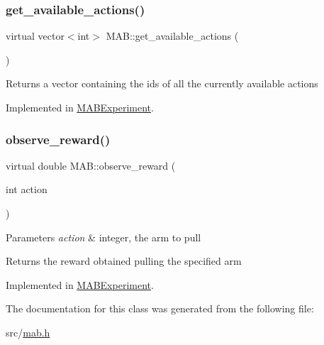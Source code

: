 \subsubsection{\texorpdfstring{get\+\_\+available\+\_\+actions()}{get\_available\_actions()}}
{\footnotesize\ttfamily virtual vector$<$int$>$ M\+A\+B\+::get\+\_\+available\+\_\+actions (\begin{DoxyParamCaption}{ }\end{DoxyParamCaption})\hspace{0.3cm}{\ttfamily [pure virtual]}}

\begin{DoxyReturn}{Returns}
a vector containing the ids of all the currently available actions 
\end{DoxyReturn}


Implemented in \mbox{\hyperlink{class_m_a_b_experiment_af64386f9138dcd31873d9218b7adf6fb}{M\+A\+B\+Experiment}}.

\mbox{\label{class_m_a_b_a83c6ba499e761ea4a246aa7bb790eb46}} 
\subsubsection{\texorpdfstring{observe\+\_\+reward()}{observe\_reward()}}
{\footnotesize\ttfamily virtual double M\+A\+B\+::observe\+\_\+reward (\begin{DoxyParamCaption}\item[{int}]{action }\end{DoxyParamCaption})\hspace{0.3cm}{\ttfamily [pure virtual]}}


\begin{DoxyParams}{Parameters}
{\em action} & integer, the arm to pull \\
\hline
\end{DoxyParams}
\begin{DoxyReturn}{Returns}
the reward obtained pulling the specified arm 
\end{DoxyReturn}


Implemented in \mbox{\hyperlink{class_m_a_b_experiment_acf2ca557df3d30325d8ff180c223a54a}{M\+A\+B\+Experiment}}.



The documentation for this class was generated from the following file\+:\begin{DoxyCompactItemize}
\item 
src/\mbox{\hyperlink{mab_8h}{mab.\+h}}\end{DoxyCompactItemize}
